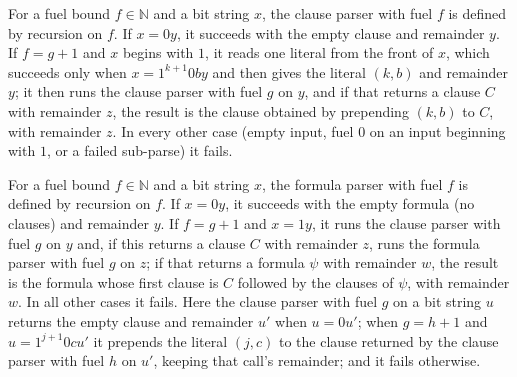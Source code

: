 \begin{definition}
\label{Std.Sat.CNF.parseClause}
\leanok
{}
For a fuel bound $f \in \mathbb{N}$ and a bit string $x$, the clause parser with fuel $f$ is
defined by recursion on $f$. If $x = 0y$, it succeeds with the empty clause and remainder
$y$. If $f = g + 1$ and $x$ begins with $1$, it reads one literal from the front of $x$,
which succeeds only when $x = 1^{k+1}0by$ and then gives the literal $(k,b)$ and remainder
$y$; it then runs the clause parser with fuel $g$ on $y$, and if that returns a clause $C$
with remainder $z$, the result is the clause obtained by prepending $(k,b)$ to $C$, with
remainder $z$. In every other case (empty input, fuel $0$ on an input beginning with $1$,
or a failed sub-parse) it fails.
\end{definition}

\begin{definition}
\label{Std.Sat.CNF.parseClauses}
\leanok
{}
For a fuel bound $f \in \mathbb{N}$ and a bit string $x$, the formula parser with fuel $f$
is defined by recursion on $f$. If $x = 0y$, it succeeds with the empty formula (no
clauses) and remainder $y$. If $f = g+1$ and $x = 1y$, it runs the clause parser with fuel
$g$ on $y$ and, if this returns a clause $C$ with remainder $z$, runs the formula parser
with fuel $g$ on $z$; if that returns a formula $\psi$ with remainder $w$, the result is
the formula whose first clause is $C$ followed by the clauses of $\psi$, with remainder
$w$. In all other cases it fails. Here the clause parser with fuel $g$ on a bit string $u$
returns the empty clause and remainder $u'$ when $u = 0u'$; when $g = h+1$ and
$u = 1^{j+1}0cu'$ it prepends the literal $(j,c)$ to the clause returned by the clause
parser with fuel $h$ on $u'$, keeping that call's remainder; and it fails otherwise.
\end{definition}

